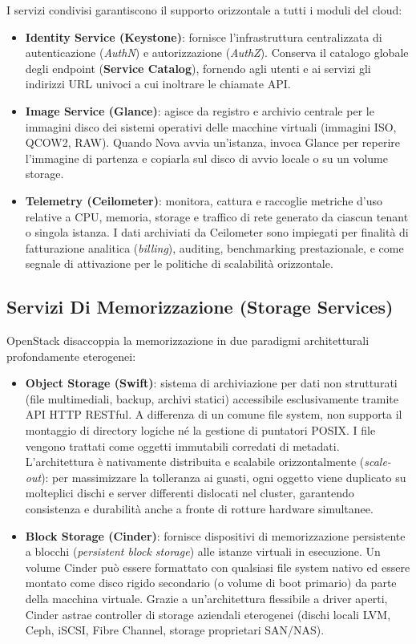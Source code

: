 \documentclass[11pt, a4paper]{article}
\begin{document}
I servizi condivisi garantiscono il supporto orizzontale a tutti i moduli del cloud:
\begin{itemize}
    \item \textbf{Identity Service (Keystone)}: fornisce l'infrastruttura centralizzata di autenticazione (\emph{AuthN}) e autorizzazione (\emph{AuthZ}). Conserva il catalogo globale degli endpoint (\textbf{Service Catalog}), fornendo agli utenti e ai servizi gli indirizzi URL univoci a cui inoltrare le chiamate API.
    \item \textbf{Image Service (Glance)}: agisce da registro e archivio centrale per le immagini disco dei sistemi operativi delle macchine virtuali (immagini ISO, QCOW2, RAW). Quando Nova avvia un'istanza, invoca Glance per reperire l'immagine di partenza e copiarla sul disco di avvio locale o su un volume storage.
    \item \textbf{Telemetry (Ceilometer)}: monitora, cattura e raccoglie metriche d'uso relative a CPU, memoria, storage e traffico di rete generato da ciascun tenant o singola istanza. I dati archiviati da Ceilometer sono impiegati per finalità di fatturazione analitica (\emph{billing}), auditing, benchmarking prestazionale, e come segnale di attivazione per le politiche di scalabilità orizzontale.
\end{itemize}

\subsection{Servizi Di Memorizzazione (Storage Services)}

OpenStack disaccoppia la memorizzazione in due paradigmi architetturali profondamente eterogenei:

\begin{itemize}
    \item \textbf{Object Storage (Swift)}: sistema di archiviazione per dati non strutturati (file multimediali, backup, archivi statici) accessibile esclusivamente tramite API HTTP RESTful. A differenza di un comune file system, non supporta il montaggio di directory logiche né la gestione di puntatori POSIX. I file vengono trattati come oggetti immutabili corredati di metadati. L'architettura è nativamente distribuita e scalabile orizzontalmente (\emph{scale-out}): per massimizzare la tolleranza ai guasti, ogni oggetto viene duplicato su molteplici dischi e server differenti dislocati nel cluster, garantendo consistenza e durabilità anche a fronte di rotture hardware simultanee.
    \item \textbf{Block Storage (Cinder)}: fornisce dispositivi di memorizzazione persistente a blocchi (\emph{persistent block storage}) alle istanze virtuali in esecuzione. Un volume Cinder può essere formattato con qualsiasi file system nativo ed essere montato come disco rigido secondario (o volume di boot primario) da parte della macchina virtuale. Grazie a un'architettura flessibile a driver aperti, Cinder astrae controller di storage aziendali eterogenei (dischi locali LVM, Ceph, iSCSI, Fibre Channel, storage proprietari SAN/NAS).
\end{itemize}
\end{document}

